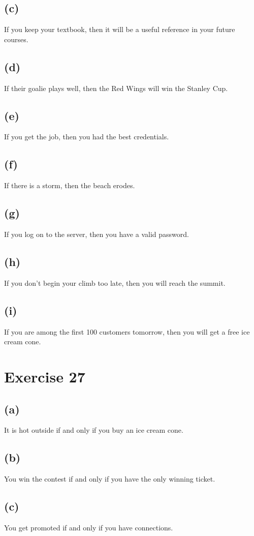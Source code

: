 \documentclass{article}
\begin{document}
	\subsection{(c)}
	If you keep your textbook, then it will be a useful reference in your future courses.
	\subsection{(d)}
	If their goalie plays well, then the Red Wings will win the Stanley Cup.
	\subsection{(e)}
	If you get the job, then you had the best credentials.
	\subsection{(f)}
	If there is a storm, then the beach erodes.
	\subsection{(g)}
	If you log on to the server, then you have a valid password.
	\subsection{(h)}
	If you don't begin your climb too late, then you will reach the summit.
	\subsection{(i)}
	If you are among the first 100 customers tomorrow, then you will get a free ice cream cone.
	
	\pagebreak
	
	\section{Exercise 27}
	\subsection{(a)}
	It is hot outside if and only if you buy an ice cream cone.
	\subsection{(b)}
	You win the contest if and only if you have the only winning ticket.
	\subsection{(c)}
	You get promoted if and only if you have connections.
\end{document}

